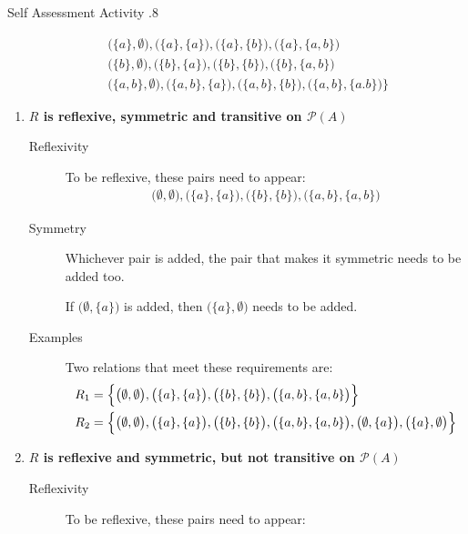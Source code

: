 \documentclass[../notes.tex]{subfiles}
\begin{document}
\begin{exercise}{Self Assessment Activity \thechapter.8}
\begin{enumerate}
\begin{align*}
									& \quad \bigl(\{a\}, \emptyset\bigr), \bigl(\{a\}, \{a\}\bigr), \bigl(\{a\}, \{b\}\bigr), \bigl(\{a\}, \{a, b\}\bigr)\\
									& \quad \bigl(\{b\}, \emptyset\bigr), \bigl(\{b\}, \{a\}\bigr), \bigl(\{b\}, \{b\}\bigr), \bigl(\{b\}, \{a, b\}\bigr)\\
									& \quad \bigl(\{a, b\}, \emptyset\bigr), \bigl(\{a, b\}, \{a\}\bigr), \bigl(\{a, b\}, \{b\}\bigr), \bigl(\{a, b\}, \{a. b\}\bigr)
								\Bigr\}
							\end{align*}
							\begin{enumerate}[label=(\alph*)]
								\item \textbf{$R$ is reflexive, symmetric and transitive on $\mathcal{P}(A)$}
									\begin{description}
										\item[Reflexivity] To be reflexive, these pairs need to appear:
											\begin{align*}
												\bigl(\emptyset, \emptyset\bigr), \bigl(\{a\}, \{a\}\bigr), \bigl(\{b\}, \{b\}\bigr), \bigl(\{a, b\}, \{a, b\}\bigr)
											\end{align*}
										\item[Symmetry] Whichever pair is added, the pair that makes it symmetric needs to be added too.
											\begin{indentparagraph}
												If $\bigl(\emptyset, \{a\}\bigr)$ is added, then $\bigl(\{a\}, \emptyset\bigr)$ needs to be added.
											\end{indentparagraph}
										\item[Examples] Two relations that meet these requirements are:
											\begin{align*}
												R_{1} &= \Bigl\{\bigl(\emptyset, \emptyset\bigr), \bigl(\{a\}, \{a\}\bigr), \bigl(\{b\}, \{b\}\bigr), \bigl(\{a, b\}, \{a, b\}\bigr)\Bigr\}\\
												R_{2} &= \Bigl\{\bigl(\emptyset, \emptyset\bigr), \bigl(\{a\}, \{a\}\bigr), \bigl(\{b\}, \{b\}\bigr), \bigl(\{a, b\}, \{a, b\}\bigr), \bigl(\emptyset, \{a\}\bigr), \bigl(\{a\}, \emptyset\bigr)\Bigr\}
											\end{align*}
									\end{description}
								\item \textbf{$R$ is reflexive and symmetric, but not transitive on $\mathcal{P}(A)$}
									\begin{description}
										\item[Reflexivity] To be reflexive, these pairs need to appear:

\end{description}
\end{enumerate}
\end{enumerate}
\end{exercise}
\end{document}
